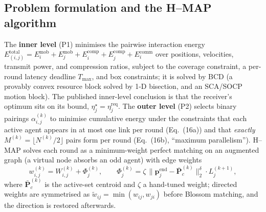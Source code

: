 \documentclass[11pt,a4paper]{article}
\begin{document}
\subsection{Problem formulation and the H--MAP algorithm}
The \textbf{inner level} (P1) minimises the pairwise interaction energy $E^{\mathrm{total}}_{(i,j)}=E^{\mathrm{mob}}_i+E^{\mathrm{mob}}_j+E^{\mathrm{comp}}_i+E^{\mathrm{comp}}_j+E^{\mathrm{comm}}_i$ over positions, velocities, transmit power, and compression ratios, subject to the coverage constraint, a per-round latency deadline $T_{\max}$, and box constraints; it is solved by BCD (a provably convex resource block solved by 1-D bisection, and an SCA/SOCP motion block). The published inner-level conclusion is that the receiver's optimum sits on its bound, $\eta_j^{\star}=\eta_j^{\mathrm{req}}$. The \textbf{outer level} (P2) selects binary pairings $\alpha^{(k)}_{i,j}$ to minimise cumulative energy under the constraints that each active agent appears in at most one link per round (Eq.~(16a)) and that \emph{exactly} $M^{(k)}=\lfloor N^{(k)}/2\rfloor$ pairs form per round (Eq.~(16b), ``maximum parallelism''). H--MAP solves each round as a minimum-weight perfect matching on an augmented graph (a virtual node absorbs an odd agent) with edge weights
\begin{equation}
w^{(k)}_{i,j}=W^{(k)}_{i,j}+\Phi^{(k)}_j,\qquad
\Phi^{(k)}_j=\zeta\,\big\lVert \mathbf p^{\mathrm{end}}_j-\bar{\mathbf P}^{(k)}_c\big\rVert_2^{\delta}\cdot L_j^{(k+1)},
\label{eq:potential}
\end{equation}
where $\bar{\mathbf P}^{(k)}_c$ is the active-set centroid and $\zeta$ a hand-tuned weight; directed weights are symmetrised as $\tilde w_{ij}=\min(w_{ij},w_{ji})$ before Blossom matching, and the direction is restored afterwards.
\end{document}
